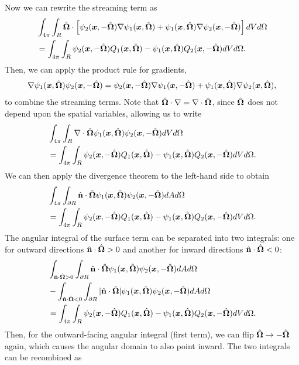 Now we can rewrite the streaming term as
\begin{align}
  &\int_{4\pi} \int_R \hat{\mathbf{\Omega}} \cdot \left[ \psi_2(\bm{x},-\hat{\mathbf{\Omega}}) \nabla \psi_1(\bm{x},\hat{\mathbf{\Omega}}) + \psi_1(\bm{x},\hat{\mathbf{\Omega}}) \nabla \psi_2(\bm{x},-\hat{\mathbf{\Omega}}) \right] dV d\Omega \nonumber \\*
  &= \int_{4\pi} \int_R  \psi_2(\bm{x},-\hat{\mathbf{\Omega}}) Q_1(\bm{x},\hat{\mathbf{\Omega}}) - \psi_1(\bm{x},\hat{\mathbf{\Omega}}) Q_2(\bm{x},-\hat{\mathbf{\Omega}}) dV d\Omega.
\end{align}
Then, we can apply the product rule for gradients,
\begin{align}
  \nabla \psi_1(\bm{x},\hat{\mathbf{\Omega}}) \psi_2(\bm{x},-\hat{\mathbf{\Omega}}) = \psi_2(\bm{x},-\hat{\mathbf{\Omega}}) \nabla \psi_1(\bm{x},-\hat{\mathbf{\Omega}}) + \psi_1(\bm{x},\hat{\mathbf{\Omega}}) \nabla \psi_2(\bm{x},\hat{\mathbf{\Omega}}),
\end{align}
to combine the streaming terms. Note that $\hat{\mathbf{\Omega}} \cdot \nabla = \nabla \cdot \hat{\mathbf{\Omega}}$, since $\hat{\mathbf{\Omega}}$ does not depend upon the spatial variables, allowing us to write
\begin{align}
  &\int_{4\pi} \int_R \nabla \cdot \hat{\mathbf{\Omega}} \psi_1(\bm{x},\hat{\mathbf{\Omega}}) \psi_2(\bm{x},-\hat{\mathbf{\Omega}}) dV d\Omega \nonumber \\*
  &= \int_{4\pi} \int_R  \psi_2(\bm{x},-\hat{\mathbf{\Omega}}) Q_1(\bm{x},\hat{\mathbf{\Omega}}) - \psi_1(\bm{x},\hat{\mathbf{\Omega}}) Q_2(\bm{x},-\hat{\mathbf{\Omega}}) dV d\Omega.
\end{align}
We can then apply the divergence theorem to the left-hand side to obtain
\begin{align}
  &\int_{4\pi} \int_{\partial R} \hat{\mathbf{n}} \cdot \hat{\mathbf{\Omega}} \psi_1(\bm{x},\hat{\mathbf{\Omega}}) \psi_2(\bm{x},-\hat{\mathbf{\Omega}}) dA d\Omega \nonumber \\*
  &= \int_{4\pi} \int_R  \psi_2(\bm{x},-\hat{\mathbf{\Omega}}) Q_1(\bm{x},\hat{\mathbf{\Omega}}) - \psi_1(\bm{x},\hat{\mathbf{\Omega}}) Q_2(\bm{x},-\hat{\mathbf{\Omega}}) dV d\Omega.
\end{align}
The angular integral of the surface term can be separated into two integrals: one for outward directions $\hat{\mathbf{n}} \cdot \hat{\mathbf{\Omega}} > 0$ and another for inward directions $\hat{\mathbf{n}} \cdot \hat{\mathbf{\Omega}} < 0$:
\begin{align}
  &\int_{\hat{\mathbf{n}} \cdot \hat{\mathbf{\Omega}} > 0} \int_{\partial R} \hat{\mathbf{n}} \cdot \hat{\mathbf{\Omega}} \psi_1(\bm{x},\hat{\mathbf{\Omega}}) \psi_2(\bm{x},-\hat{\mathbf{\Omega}}) dA d\Omega \nonumber \\*
  &- \int_{\hat{\mathbf{n}} \cdot \hat{\mathbf{\Omega}} < 0} \int_{\partial R} |\hat{\mathbf{n}} \cdot \hat{\mathbf{\Omega}}| \psi_1(\bm{x},\hat{\mathbf{\Omega}}) \psi_2(\bm{x},-\hat{\mathbf{\Omega}}) dA d\Omega \nonumber \\*
  &= \int_{4\pi} \int_R  \psi_2(\bm{x},-\hat{\mathbf{\Omega}}) Q_1(\bm{x},\hat{\mathbf{\Omega}}) - \psi_1(\bm{x},\hat{\mathbf{\Omega}}) Q_2(\bm{x},-\hat{\mathbf{\Omega}}) dV d\Omega.
\end{align}
Then, for the outward-facing angular integral (first term), we can flip $\hat{\mathbf{\Omega}} \rightarrow -\hat{\mathbf{\Omega}}$ again, which causes the angular domain to also point inward. The two integrals can be recombined as

